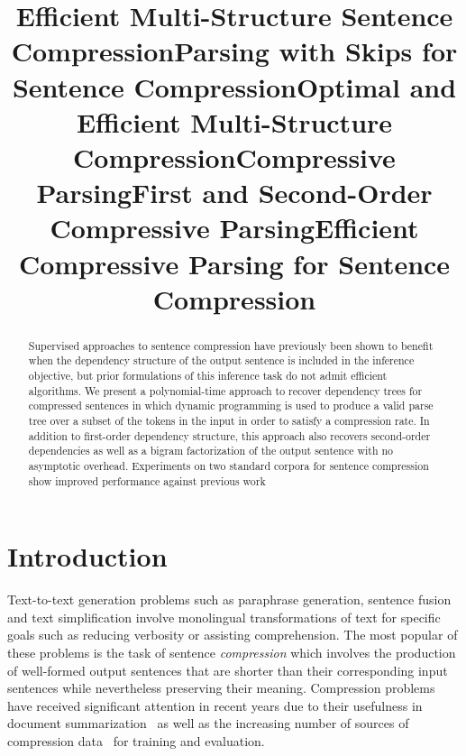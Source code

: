 \documentclass[11pt,a4paper]{article}
\title{Efficient Multi-Structure Sentence Compression}
\title{Parsing with Skips for Sentence Compression}
\title{Optimal and Efficient Multi-Structure Compression}
\title{Compressive Parsing}
\title{First and Second-Order Compressive Parsing}
\title{Efficient Compressive Parsing for Sentence Compression}
\author{}
\date{}
\begin{document}
\maketitle
\begin{abstract}
    Supervised approaches to sentence compression have previously been shown
    to benefit when the dependency structure of the output sentence is
    included in the inference objective, but prior formulations of this
    inference task do not admit efficient algorithms.
    We present a polynomial-time approach to recover dependency trees
    for compressed sentences in which dynamic programming is used to
    produce a valid parse tree over a subset of the tokens in the input
    in order to satisfy a compression rate. In addition to first-order
    dependency structure, this approach also recovers
    second-order dependencies as well as a bigram factorization of the
    output sentence with no asymptotic overhead.
    Experiments on two standard corpora for sentence compression show
    improved performance against previous work

\end{abstract}

\section{Introduction}
\label{intro}

Text-to-text generation problems such as paraphrase generation,
sentence fusion and text simplification involve
monolingual transformations of text for specific goals
such as reducing verbosity or assisting comprehension.
The most popular of these problems is the task of
sentence \emph{compression} which involves
the production of well-formed output sentences that are shorter than
their corresponding input sentences while nevertheless preserving their
meaning.
Compression problems have received significant attention in
recent years due to their usefulness in document summarization~\cite{zajic07}
as well as the increasing number of sources of compression
data~\cite{knight00,clarke06a,galanis11,filippova13} for training
and evaluation.
\end{document}
